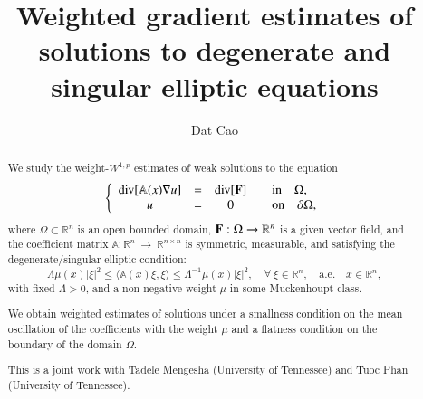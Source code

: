 \documentclass[12pt]{amsart}
\begin{document}
\title{Weighted gradient estimates of solutions to degenerate and singular elliptic equations}
\author{Dat Cao}
\begin{abstract}
We study the weight-$W^{1,p}$ estimates of weak solutions to the equation
\[
\left\{
\begin{array}{cccl}
\text{div} [\mathbb{A}(x)\nabla u] & = & \text{div}[{\bf F}] &\quad \text{in} \quad \Omega,\\
 u & = &0 & \quad \text{on} \quad \partial\Omega,
 \end{array}
\right.
\]
where  $\Omega \subset \mathbb{R}^n$ is an open bounded domain, ${\bf F}:\Omega\rightarrow \mathbb{R}^{n}$ is a given vector field, and the coefficient matrix  $\mathbb{A}: \mathbb{R}^{n}~\rightarrow~\mathbb{R}^{n\times n}$ is  symmetric, measurable,  and satisfying the degenerate/singular elliptic condition:
\[
\Lambda \mu(x) |\xi|^2 \leq \langle \mathbb{A}(x) \xi, \xi \rangle \leq \Lambda^{-1} \mu(x) |\xi|^2, \quad \forall \ \xi \in \mathbb{R}^n, \quad \text{a.e.} \quad x \in \mathbb{R}^n,
\]
with fixed  $\Lambda >0$, and a non-negative weight $\mu$ in some Muckenhoupt class. 

We obtain weighted estimates of solutions under a smallness condition on the mean oscillation of the coefficients with the weight $\mu$ and a flatness condition on the boundary of the domain $\Omega$.


This is a joint work with Tadele Mengesha (University of Tennessee) and Tuoc Phan (University of Tennessee).
\end{abstract}
\maketitle
\end{document}
